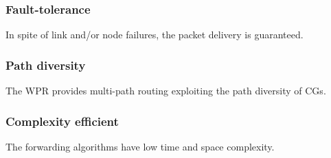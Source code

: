 \subsubsection{Fault-tolerance} In spite of link and/or node failures, the packet delivery is guaranteed.
\subsubsection{Path diversity} The WPR provides multi-path routing exploiting the path diversity of CGs.
\subsubsection{Complexity efficient}
The forwarding algorithms have low time and space complexity. 